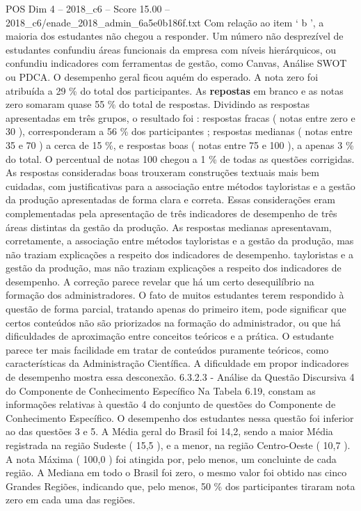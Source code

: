 \begin{textsample}{POS Dim 4 – 2018\_c6 – Score 15.00 – 2018\_c6/enade\_2018\_admin\_6a5e0b186f.txt}
Com relação ao item ‘ b ’, a maioria dos estudantes não chegou a responder.
Um número não desprezível de estudantes confundiu áreas funcionais da empresa com níveis hierárquicos, ou confundiu indicadores com ferramentas de gestão, como Canvas, Análise SWOT ou PDCA.
O desempenho geral ficou aquém do esperado.
A nota zero foi atribuída a 29 \% do total dos participantes.
As \textbf{repostas} em branco e as notas zero somaram quase 55 \% do total de respostas.
Dividindo as respostas apresentadas em três grupos, o resultado foi : respostas fracas ( notas entre zero e 30 ), corresponderam a 56 \% dos participantes ; respostas medianas ( notas entre 35 e 70 ) a cerca de 15 \%, e respostas boas ( notas entre 75 e 100 ), a apenas 3 \% do total.
O percentual de notas 100 chegou a 1 \% de todas as questões corrigidas.
As respostas consideradas boas trouxeram construções textuais mais bem cuidadas, com justificativas para a associação entre métodos tayloristas e a gestão da produção apresentadas de forma clara e correta.
Essas considerações eram complementadas pela apresentação de três indicadores de desempenho de três áreas distintas da gestão da produção.
As respostas medianas apresentavam, corretamente, a associação entre métodos tayloristas e a gestão da produção, mas não traziam explicações a respeito dos indicadores de desempenho. tayloristas e a gestão da produção, mas não traziam explicações a respeito dos indicadores de desempenho.
A correção parece revelar que há um certo desequilíbrio na formação dos administradores.
O fato de muitos estudantes terem respondido à questão de forma parcial, tratando apenas do primeiro item, pode significar que certos conteúdos não são priorizados na formação do administrador, ou que há dificuldades de aproximação entre conceitos teóricos e a prática.
O estudante parece ter mais facilidade em tratar de conteúdos puramente teóricos, como características da Administração Científica.
A dificuldade em propor indicadores de desempenho mostra essa desconexão. 6.3.2.3 - Análise da Questão Discursiva 4 do Componente de Conhecimento Específico Na Tabela 6.19, constam as informações relativas à questão 4 do conjunto de questões do Componente de Conhecimento Específico.
O desempenho dos estudantes nessa questão foi inferior ao das questões 3 e 5.
A Média geral do Brasil foi 14,2, sendo a maior Média registrada na região Sudeste ( 15,5 ), e a menor, na região Centro-Oeste ( 10,7 ).
A nota Máxima ( 100,0 ) foi atingida por, pelo menos, um concluinte de cada região.
A Mediana em todo o Brasil foi zero, o mesmo valor foi obtido nas cinco Grandes Regiões, indicando que, pelo menos, 50 \% dos participantes tiraram nota zero em cada uma das regiões.

\end{textsample}

